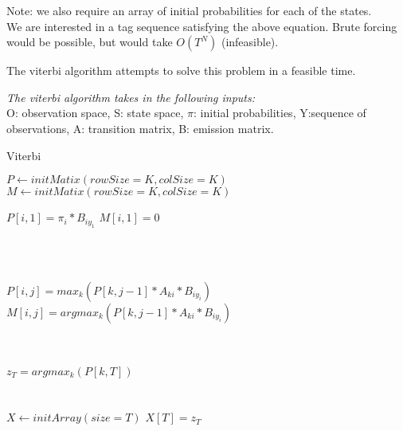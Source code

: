 \documentclass[]{article}
\begin{document}
	Note: we also require an array of initial probabilities for each of the states. \\
	
	We are interested in a tag sequence satisfying the above equation. Brute forcing would be possible, but would take $O(T^N)$ (infeasible). 
	
	The viterbi algorithm attempts to solve this problem in a feasible time.
	
	\textit{The viterbi algorithm takes in the following inputs:} \\ O: observation space, S: state space, $\pi$: initial probabilities, Y:sequence of observations, A: transition matrix, B: emission matrix. 
	
	
	\begin{algorithm}
		\caption{Viterbi}
		\begin{algorithmic}[1]
            
            
            \State $P \gets initMatix(rowSize=K, colSize=K)$ 
            \State $M \gets initMatix(rowSize=K, colSize=K)$ 
            
            
             
                \State $P[i, 1] = \pi_i * B_{iy_1}$
                \State $M[i, 1] = 0$
            \EndFor
            
            \\ \\
                
                
                    \State $P[i, j] = max_k(P[k, j-1] * A_{ki} * B_{iy_i})$
                    \State $M[i, j] = argmax_k(P[k, j-1] * A_{ki} * B_{iy_i})$
                
                \EndFor
            
            \EndFor
           
            \\ \\
            
            \State $z_T = argmax_k (P[k, T])$
            \\ \\
            \\
            \State $X \gets initArray(size=T)$
            \State $X[T] = z_T$
            

\end{algorithmic}
\end{algorithm}
\end{document}
